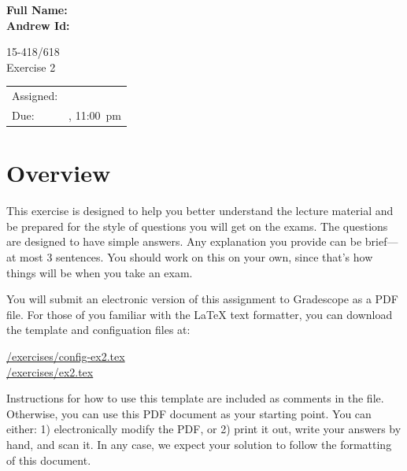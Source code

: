 \documentclass[11pt]{article}
\newcommand{\cref}[2]{\href{#1}{\color{blue}#2}}
\begin{document}
\begin{flushright}                         
{\large\bf Full Name: \makebox[2in][l]{    
                                           
                                           
}} \\[1ex]                                 
                                           
{\large\bf Andrew Id: \makebox[2in][l]{\tt 
                                           
}} \\[1ex]                                 
\end{flushright}                           
\vspace*{0.3in}                            
\begin{center}
\LARGE
15-418/618 \thisterm{} \\
Exercise 2
\end{center}

\begin{center}
\Large        
\begin{tabular}{ll}
\hline             
Assigned: & \dateassigned{}  \\
Due: &  \datedue{}, 11:00~pm  \\
\hline       
\end{tabular}
\end{center} 

\section*{Overview}

This exercise is designed to help you better understand the lecture
material and be prepared for the style of questions you will get on
the exams.  The questions are designed to have simple answers.  Any
explanation you provide can be brief---at most 3 sentences.  You
should work on this on your own, since that's how things will be when
you take an exam.

You will submit an electronic version of this assignment to Gradescope 
as a PDF file.  For those of you familiar with the \LaTeX{} text 
formatter, you can download the template and configuation files at: 
\begin{center} 
  \cref{\actualcoursehome/exercises/config-ex2.tex}{\visiblecoursehome/exercises/config-ex2.tex}\\ 
  \cref{\actualcoursehome/exercises/ex2.tex}{\visiblecoursehome/exercises/ex2.tex} 
\end{center} 
Instructions for how to use this template are included as comments in 
the file.  Otherwise, you can use this PDF document as your starting 
point.  You can either: 1) electronically modify the PDF, or 2) print 
it out, write your answers by hand, and scan it.  In any case, we 
expect your solution to follow the formatting of this document. 
\end{document}

